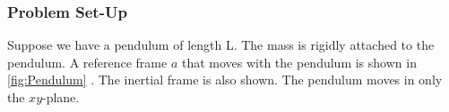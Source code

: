 \documentclass[10pt, openany, titlepage]{book}
\theoremstyle{definition}
\let\oldautoref\autoref
\renewcommand{\autoref}[1]{%
  \begingroup
  \hypersetup{linkcolor=black}%
  \oldautoref{#1}%
  \endgroup
}
\begin{document}
\subsubsection{Problem Set-Up}
Suppose we have a pendulum of length L. The mass is rigidly attached to the pendulum. A reference frame $a$ that moves with the pendulum is shown in \autoref{fig:Pendulum}. The \gls{inertial frame} is also shown. The pendulum moves in only the $xy$-plane.
\begin{figure}[ht]

\centering


\begin{tikzpicture}[x=0.75pt,y=0.75pt,yscale=-1,xscale=1]


\end{tikzpicture}
\end{figure}
\end{document}
